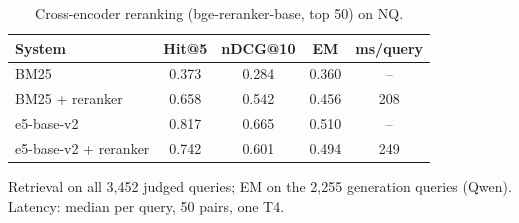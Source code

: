 \begin{table}[t]
\centering
\small
\caption{Cross-encoder reranking (bge-reranker-base, top 50) on NQ.}
\label{tab:reranker}
\begin{tabular}{lcccc}
\toprule
System & Hit@5 & nDCG@10 & EM & ms/query \\
\midrule
BM25 & 0.373 & 0.284 & 0.360 & -- \\
BM25 + reranker & 0.658 & 0.542 & 0.456 & 208 \\
e5-base-v2 & 0.817 & 0.665 & 0.510 & -- \\
e5-base-v2 + reranker & 0.742 & 0.601 & 0.494 & 249 \\
\bottomrule
\end{tabular}
\par\smallskip\parbox{\linewidth}{\footnotesize Retrieval on all 3,452 judged queries; EM on the 2,255 generation queries (Qwen). Latency: median per query, 50 pairs, one T4.}
\end{table}
